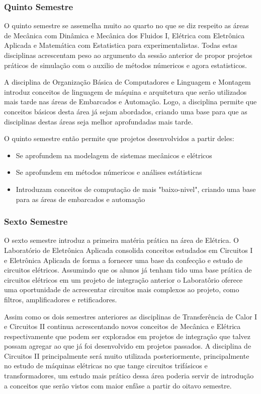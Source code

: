 \documentclass[12pt]{article} %
\begin{document}
\subsubsection{Quinto Semestre}
O quinto semestre se assemelha muito ao quarto no que se diz respeito as áreas de Mecânica com Dinâmica e Mecânica dos Fluidos I, Elétrica com Eletrônica Aplicada e Matemática com Estatistica para experimentalistas. Todas estas disciplinas acrescentam peso ao argumento da sessão anterior de propor projetos práticos de simulação com o auxilio de métodos númericos e agora estatisticos. 

A disciplina de Organização Básica de Computadores e Linguagem e Montagem introduz conceitos de linguagem de máquina e arquitetura que serão utilizados mais tarde nas áreas de Embarcados e Automação. Logo, a disciplina permite que conceitos básicos desta área já sejam abordados, criando uma base para que as disciplinas destas áreas seja melhor aprofundadas mais tarde.

O quinto semestre então permite que projetos desenvolvidos a partir deles:

\begin{itemize}
\item Se aprofundem na modelagem de sistemas mecânicos e elétricos
\item Se aprofundem em métodos númericos e análises estátisticas
\item Introduzam conceitos de computação de mais "baixo-nivel", criando uma base para as áreas de embarcados e automação
\end{itemize}

\subsubsection{Sexto Semestre}

O sexto semestre introduz a primeira matéria prática na área de Elétrica. O Laboratório de Eletrônica Aplicada consolida conceitos estudados em Circuitos I e Eletrônica Aplicada de forma a fornecer uma base da confecção e estudo de circuitos elétricos. Assumindo que os alunos já tenham tido uma base prática de circuitos elétricos em um projeto de integração anterior o Laboratôrio oferece uma oportunidade de acrescentar circuitos mais complexos ao projeto, como filtros, amplificadores e retificadores.

Assim como os dois semestres anteriores as disciplinas de Transferência de Calor I e Circuitos II continua acrescentando novos conceitos de Mecânica e Elétrica respectivamente que podem ser explorados em projetos de integração que talvez possam agregar ao que já foi desenvolvido em projetos passados. A disciplina de Circuitos II principalmente será muito utilizada posteriormente, principalmente no estudo de máquinas elétricas no que tange circuitos trifásicos e transformadores, um estudo mais prático dessa área poderia servir de introdução a conceitos que serão vistos com maior enfâse a partir do oitavo semestre.
\end{document}
